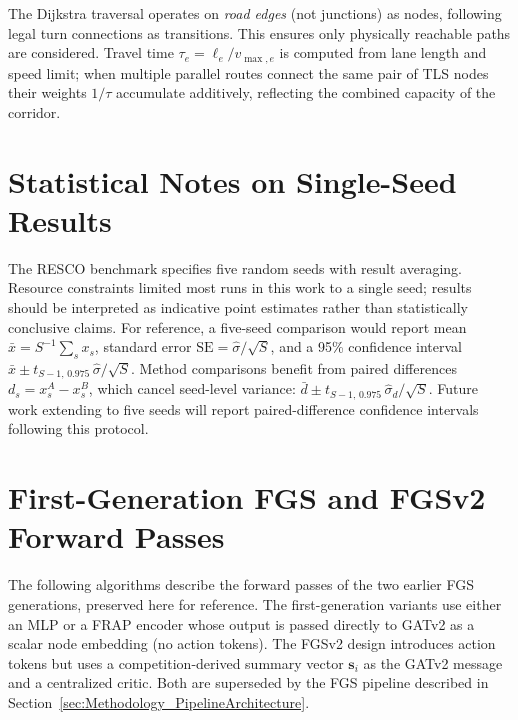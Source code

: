 The Dijkstra traversal operates on \emph{road edges} (not junctions) as nodes, following legal turn connections as transitions. This ensures only physically reachable paths are considered. Travel time $\tau_e = \ell_e / v_{\max,e}$ is computed from lane length and speed limit; when multiple parallel routes connect the same pair of TLS nodes their weights $1/\tau$ accumulate additively, reflecting the combined capacity of the corridor.

\section{Statistical Notes on Single-Seed Results}
\label{sec:Appendix_stats}

The RESCO benchmark specifies five random seeds with result averaging. Resource constraints limited most runs in this work to a single seed; results should be interpreted as indicative point estimates rather than statistically conclusive claims. For reference, a five-seed comparison would report mean $\bar x = S^{-1}\sum_s x_s$, standard error $\mathrm{SE}=\hat\sigma/\!\sqrt{S}$, and a 95\% confidence interval $\bar x \pm t_{S-1,\,0.975}\,\hat\sigma/\!\sqrt{S}$. Method comparisons benefit from paired differences $d_s = x_s^A - x_s^B$, which cancel seed-level variance: $\bar d \pm t_{S-1,\,0.975}\,\hat\sigma_d/\!\sqrt{S}$. Future work extending to five seeds will report paired-difference confidence intervals following this protocol.

\section{First-Generation FGS and FGSv2 Forward Passes}
\label{sec:Appendix_EarlierAlgorithms}

The following algorithms describe the forward passes of the two earlier FGS generations, preserved here for reference. The first-generation variants use either an MLP or a FRAP encoder whose output is passed directly to GATv2 as a scalar node embedding (no action tokens). The FGSv2 design introduces action tokens but uses a competition-derived summary vector $\mathbf{s}_i$ as the GATv2 message and a centralized critic. Both are superseded by the FGS pipeline described in Section~\ref{sec:Methodology_PipelineArchitecture}.


